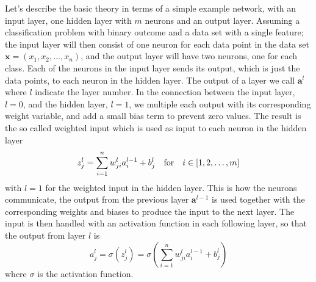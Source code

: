 \documentclass[10pt, twocolumn]{article}
\begin{document}
Let's describe the basic theory in terms of a simple example network, with an input layer, one hidden layer with $m$ neurons and an output layer. Assuming a classification problem with binary outcome and a data set with a single feature; the input layer will then consist of one neuron for each data point in the data set $\bm{x} = \left(x_1,x_2,\ldots, x_n\right)$, and the output layer will have two neurons, one for each class. Each of the neurons in the input layer sends its output, which is just the data points, to each neuron in the hidden layer. The output of a layer we call $\bm{a}^l$ where $l$ indicate the layer number. In the connection between the input layer, $l=0$, and the hidden layer, $l=1$, we multiple each output with its corresponding weight variable, and add a small bias term to prevent zero values. The result is the so called weighted input which is used as input to each neuron in the hidden layer
\begin{equation}
    z_j^l = \sum_{i=1}^n w_{ji}^l a^{l-1}_i + b_j^l \qfor i\in \left[1,2,\ldots,m\right]
    \label{eq:weighted_input}
\end{equation}
with $l=1$ for the weighted input in the hidden layer. This is how the neurons communicate, the output from the previous layer $\bm{a}^{l-1}$ is used together with the corresponding weights and biases to produce the input to the next layer. The input is then handled with an activation function in each following layer, so that the output from layer $l$ is
\begin{equation}
    a_j^l = \sigma\left(z_j^l\right) = \sigma \left(\sum_{i=1}^n w_{ji}^l a^{l-1}_i + b_j^l\right)
    \label{eq:activation}
\end{equation}
where $\sigma$ is the activation function.
\end{document}

